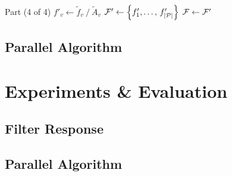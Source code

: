 \documentclass[aspectratio=169,t]{beamer}
\begin{document}
{\begin{algorithm}[H]
{\begin{block}{Part (4 of 4)}
{{{					
	\nl				$f'_v \leftarrow \tilde{f}_v\mathbin{/}\tilde{A}_v$\label{algSCFfprimev}
				}
	\nl		$\mathcal{F}' \leftarrow \left \{f'_1,\ldots,\,f'_{|\mathcal{P}|}\right \}$\;\label{algSCF2ndlastLine}
	\nl 	$\mathcal{F} \leftarrow \mathcal{F}'$\label{algSCFlastLine}
			}
		}
	\end{block}
	}
\end{algorithm}
}


\subsection[Parallel]{Parallel Algorithm}





\section{Experiments \& Evaluation}


\subsection{Filter Response}



\subsection{Parallel Algorithm}
\end{document}
